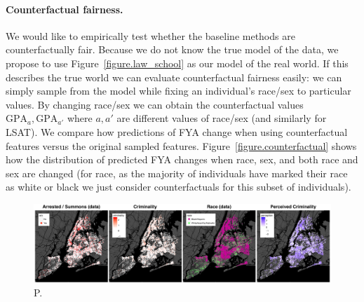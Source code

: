 \paragraph{Counterfactual fairness.}
We would like to empirically test whether the baseline methods are counterfactually fair. Because we do not know the true model of the data, we propose to use Figure~\ref{figure.law_school} as our model of the real world. If this describes the true world we can evaluate counterfactual fairness easily: we can simply sample from the model while fixing an individual's race/sex to particular values. By changing race/sex we can obtain the counterfactual values $\mbox{GPA}_a,\mbox{GPA}_{a'}$ where $a,a'$ are different values of race/sex (and similarly for LSAT). We compare how predictions of FYA change when using counterfactual features versus the original sampled features. Figure~\ref{figure.counterfactual} shows how the distribution of predicted FYA changes when race, sex, and both race and sex are changed (for race, as the majority of individuals have marked their race as white or black we just consider counterfactuals for this subset of individuals).


 

\begin{figure}[th]
\begin{center}
\vspace{-2ex}
\centerline{\includegraphics[width=\textwidth]{stop_and_frisk_graphs.png}}
\vspace{-2ex}
\caption{P.}
\label{figure.criminality}
\vspace{-2ex}
\end{center}
\end{figure}

